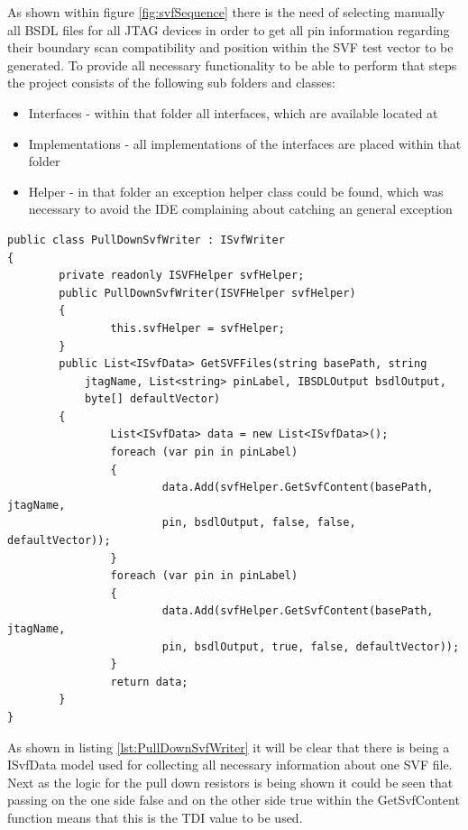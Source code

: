 As shown within figure \ref{fig:svfSequence} there is the need of selecting manually all \ac{BSDL} files for all \ac{JTAG} devices in order to get all pin information regarding their boundary scan compatibility and position within the \ac{SVF} test vector to be generated. To provide all necessary functionality to be able to perform that steps the project consists of the following sub folders and classes:
\begin{itemize}
	\item Interfaces - within that folder all interfaces, which are available located at
	\item Implementations - all implementations of the interfaces are placed within that folder
	\item Helper - in that folder an exception helper class could be found, which was necessary to avoid the \ac{IDE} complaining about catching an general exception
\end{itemize}\newpage

\begin{lstlisting}[language={[Sharp]C},caption={PullDownSvfWriter},captionpos=b,label=lst:PullDownSvfWriter]
public class PullDownSvfWriter : ISvfWriter
{
		private readonly ISVFHelper svfHelper;
		public PullDownSvfWriter(ISVFHelper svfHelper) 
		{
				this.svfHelper = svfHelper;
		}
		public List<ISvfData> GetSVFFiles(string basePath, string
			jtagName, List<string> pinLabel, IBSDLOutput bsdlOutput,
			byte[] defaultVector)
		{
				List<ISvfData> data = new List<ISvfData>();
				foreach (var pin in pinLabel)
				{
						data.Add(svfHelper.GetSvfContent(basePath, jtagName,
						pin, bsdlOutput, false, false, defaultVector));
				}
				foreach (var pin in pinLabel)
				{
						data.Add(svfHelper.GetSvfContent(basePath, jtagName,
						pin, bsdlOutput, true, false, defaultVector));
				}
				return data;
		}
}
\end{lstlisting}

As shown in listing \ref{lst:PullDownSvfWriter} it will be clear that there is being a ISvfData model used for collecting all necessary information about one \ac{SVF} file. Next as the logic for the pull down resistors is being shown it could be seen that passing on the one side false and on the other side true within the GetSvfContent function means that this is the TDI value to be used.\newpage 


